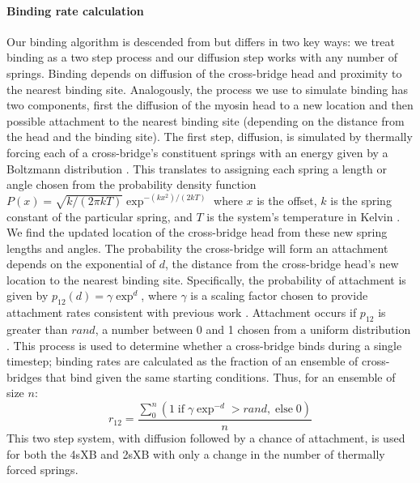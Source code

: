\documentclass[]{article}
\begin{document}
\paragraph{Binding rate calculation} %
Our binding algorithm is descended from \citet{Tanner2007} but differs in two key ways: we treat binding as a two step process and our diffusion step works with any number of springs.
Binding depends on diffusion of the cross-bridge head and proximity to the nearest binding site.
Analogously, the process we use to simulate binding has two components, first the diffusion of the myosin head to a new location and then possible attachment to the nearest binding site (depending on the distance from the head and the binding site).
The first step, diffusion, is simulated by thermally forcing each of a cross-bridge's constituent springs with an energy given by a Boltzmann distribution \citep{BergBook, HowardBook}.
This translates to assigning each spring a length or angle chosen from the probability density function $P(x) = \sqrt{k / (2 \pi kT)} \exp^{-(k x^2)/(2 kT)}$ where $x$ is the offset, $k$ is the spring constant of the particular spring, and $T$ is the system's temperature in Kelvin  \citep{DillBook, HowardBook}.
We find the updated location of the cross-bridge head from these new spring lengths and angles.
The probability the cross-bridge will form an attachment depends on the exponential of $d$, the distance from the cross-bridge head's new location to the nearest binding site.
Specifically, the probability of attachment is given by $p_{12}(d) = \gamma \exp ^{d}$, where $\gamma$ is a scaling factor chosen to provide attachment rates consistent with previous work \citep{Daniel1998, Tanner2007}.
Attachment occurs if $p_{12}$ is greater than $rand$, a number between 0 and 1 chosen from a uniform distribution \citep{Tanner2007}.
This process is used to determine whether a cross-bridge binds during a single timestep; binding rates are calculated as the fraction of an ensemble of cross-bridges that bind given the same starting conditions. 
Thus, for an ensemble of size $n$: 
$$r_{12} =  \frac{\sum_0^n \left( 1\; \textrm{if}\; \gamma \exp^{-d}>rand ,\; \textrm{else}\; 0 \right)}{n}$$
This two step system, with diffusion followed by a chance of attachment, is used for both the 4sXB and 2sXB with only a change in the number of thermally forced springs.
\end{document}
